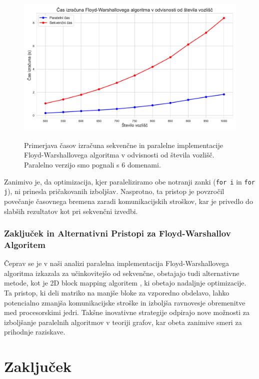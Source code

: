 \documentclass[mat1, tisk]{fmfdelo}
\begin{document}
\begin{figure}[h!]
  \centering
  \caption{Primerjava časov izračuna sekvenčne in paralelne implementacije Floyd-Warshallovega algoritma v odvisnosti od števila vozlišč. Paralelno verzijo smo pognali s 6 domenami.}
  \includegraphics[width=15cm]{slike/floyd_v_odvisnosti_od_velikosti_grafa.pdf}
  \label{fig:floyd_v_odvisnosti_od_velikosti_grafa}
\end{figure}

Zanimivo je, da optimizacija, kjer paraleliziramo obe notranji zanki (\texttt{for i} in \texttt{for j}), ni prinesla pričakovanih izboljšav.
Nasprotno, ta pristop je povzročil povečanje časovnega bremena zaradi komunikacijskih stroškov, kar je privedlo do slabših rezultatov
kot pri sekvenčni izvedbi.

\subsubsection{Zaključek in Alternativni Pristopi za Floyd-Warshallov Algoritem}

Čeprav se je v naši analizi paralelna implementacija Floyd-Warshallovega algoritma izkazala za učinkovitejšo od sekvenčne, obstajajo tudi
alternativne metode, kot je 2D block mapping algoritem \cite{parallel_floyd_warshall}, ki obetajo nadaljnje optimizacije. Ta pristop, ki deli
matriko na manjše bloke za vzporedno obdelavo, lahko potencialno zmanjša komunikacijske stroške in izboljša ravnovesje obremenitve med
procesorskimi jedri. Takšne inovativne strategije odpirajo nove možnosti za izboljšanje paralelnih algoritmov v teoriji grafov,
kar obeta zanimive smeri za prihodnje raziskave.

\section{Zaključek}
\end{document}
